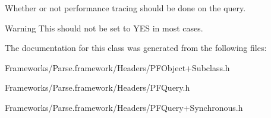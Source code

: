  





Whether or not performance tracing should be done on the query.

\begin{DoxyWarning}{Warning}
This should not be set to {\ttfamily Y\+E\+S} in most cases. 
\end{DoxyWarning}


The documentation for this class was generated from the following files\+:\begin{DoxyCompactItemize}
\item 
Frameworks/\+Parse.\+framework/\+Headers/P\+F\+Object+\+Subclass.\+h\item 
Frameworks/\+Parse.\+framework/\+Headers/P\+F\+Query.\+h\item 
Frameworks/\+Parse.\+framework/\+Headers/P\+F\+Query+\+Synchronous.\+h\end{DoxyCompactItemize}
